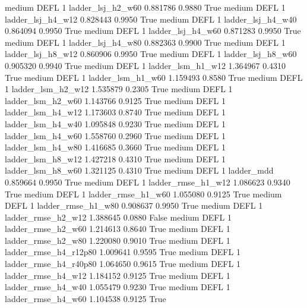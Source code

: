     medium     DEFL                 1      ladder_lsj_h2_w60   0.881786      0.9880    True
    medium     DEFL                 1      ladder_lsj_h4_w12   0.828443      0.9950    True
    medium     DEFL                 1      ladder_lsj_h4_w40   0.864094      0.9950    True
    medium     DEFL                 1      ladder_lsj_h4_w60   0.871283      0.9950    True
    medium     DEFL                 1      ladder_lsj_h4_w80   0.882363      0.9900    True
    medium     DEFL                 1      ladder_lsj_h8_w12   0.860906      0.9950    True
    medium     DEFL                 1      ladder_lsj_h8_w60   0.905320      0.9940    True
    medium     DEFL                 1      ladder_lsm_h1_w12   1.364967      0.4310    True
    medium     DEFL                 1      ladder_lsm_h1_w60   1.159493      0.8580    True
    medium     DEFL                 1      ladder_lsm_h2_w12   1.535879      0.2305    True
    medium     DEFL                 1      ladder_lsm_h2_w60   1.143766      0.9125    True
    medium     DEFL                 1      ladder_lsm_h4_w12   1.173603      0.8740    True
    medium     DEFL                 1      ladder_lsm_h4_w40   1.095848      0.9230    True
    medium     DEFL                 1      ladder_lsm_h4_w60   1.558760      0.2960    True
    medium     DEFL                 1      ladder_lsm_h4_w80   1.416685      0.3660    True
    medium     DEFL                 1      ladder_lsm_h8_w12   1.427218      0.4310    True
    medium     DEFL                 1      ladder_lsm_h8_w60   1.321125      0.4310    True
    medium     DEFL                 1             ladder_mdd   0.859664      0.9950    True
    medium     DEFL                 1     ladder_rmse_h1_w12   1.086623      0.9340    True
    medium     DEFL                 1     ladder_rmse_h1_w60   1.055080      0.9125    True
    medium     DEFL                 1     ladder_rmse_h1_w80   0.908637      0.9950    True
    medium     DEFL                 1     ladder_rmse_h2_w12   1.388645      0.0880   False
    medium     DEFL                 1     ladder_rmse_h2_w60   1.214613      0.8640    True
    medium     DEFL                 1     ladder_rmse_h2_w80   1.220080      0.9010    True
    medium     DEFL                 1  ladder_rmse_h4_r12p80   1.009641      0.9595    True
    medium     DEFL                 1  ladder_rmse_h4_r40p80   1.064650      0.9615    True
    medium     DEFL                 1     ladder_rmse_h4_w12   1.184152      0.9125    True
    medium     DEFL                 1     ladder_rmse_h4_w40   1.055479      0.9230    True
    medium     DEFL                 1     ladder_rmse_h4_w60   1.104538      0.9125    True
